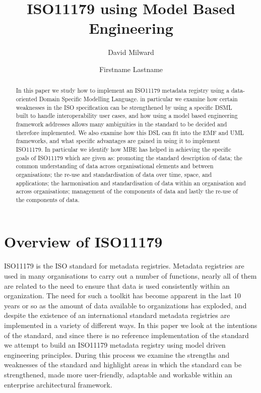 \documentclass{llncs}
\begin{document}
 

\title{ISO11179 using Model Based Engineering}

\author{David Milward \and Firstname Lastname}
\maketitle

\begin{abstract}
In this paper we study how to implement an ISO11179 metadata registry using a data-oriented Domain Specific Modelling Language.  in particular we examine how certain weaknesses in the ISO specification can be strengthened by using a specific DSML built to handle interoperability user cases, and how using a model based engineering framework addresses allows many ambiguities in the standard to be decided and therefore implemented. We also examine how this DSL can fit into the EMF and UML frameworks, and what specific advantages are gained in using it to implement ISO11179. In particular we identify how MBE has helped in achieving the specific goals of ISO11179 which are given as: promoting the standard description of data; the common understanding of data across organisational elements and between organisations; the  re-use and standardisation of data over time, space, and applications; the harmonisation and standardisation of data within an organisation and across organisations; management of the components of data and lastly the re-use of the components of data.

\end{abstract}


\noindent

\section{Overview of ISO11179}

ISO11179 is the ISO standard for metadata registries. Metadata registries are used in many organisations to carry out a number of functions, nearly all of them are related to the need to ensure that data is used consistently within an organization.  The need for such a toolkit has become apparent in the last 10 years or so as the amount of data available to organizations has exploded, and despite the existence of an international standard metadata registries are implemented in a variety of different ways. In this paper we look at the intentions of the standard, and since there is no reference implementation of the standard we attempt to build an ISO11179 metadata registry using model driven engineering principles. During this process we examine the strengths and weaknesses of the standard and highlight areas in which the standard can be strengthened, made more user-friendly, adaptable and workable within an enterprise architectural framework. 
\end{document}
